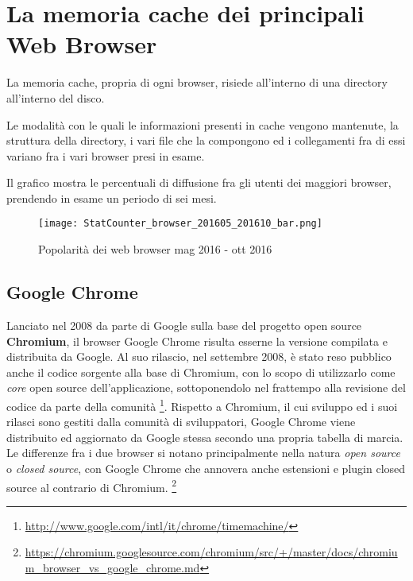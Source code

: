\chapter{La memoria cache dei principali Web Browser}

La memoria cache, propria di ogni browser, risiede all'interno di una directory all'interno del disco. 

Le modalità con le quali le informazioni presenti in cache vengono mantenute, la struttura della directory, i vari file che la compongono ed i collegamenti fra di essi variano fra i vari browser presi in esame. 

Il grafico mostra le percentuali di diffusione fra gli utenti dei maggiori browser, prendendo in esame un periodo di sei mesi.

\begin{figure}[htpb]
	\begin{center}
		\texttt{[image: StatCounter\_browser\_201605\_201610\_bar.png]}
	\end{center}
\caption[Popolarità dei web browsers mag 2016 - ott 2016]{Popolarità dei web browser mag 2016 - ott 2016 \footnotemark}
\end{figure}

\section{Google Chrome}

Lanciato nel 2008 da parte di Google sulla base del progetto open source \textbf{Chromium}, il browser Google Chrome risulta esserne la versione compilata e distribuita da Google.
Al suo rilascio, nel settembre 2008, è stato reso pubblico anche il codice sorgente alla base di Chromium, con lo scopo di utilizzarlo come \textit{core} open source dell'applicazione, sottoponendolo nel frattempo alla revisione del codice da parte della comunità \footnote{\url{http://www.google.com/intl/it/chrome/timemachine/}}. 
Rispetto a Chromium, il cui sviluppo ed i suoi rilasci sono gestiti dalla comunità di sviluppatori, Google Chrome viene distribuito ed aggiornato da Google stessa secondo una propria tabella di marcia.
Le differenze fra i due browser si notano principalmente nella natura \textit{open source} o \textit{closed source}, con Google Chrome che annovera anche estensioni e plugin closed source al contrario di Chromium. \footnote{\url{https://chromium.googlesource.com/chromium/src/+/master/docs/chromium_browser_vs_google_chrome.md}} \nocite{Chromium}

